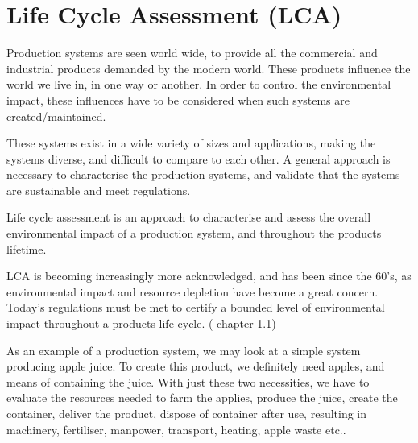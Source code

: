 \section{Life Cycle Assessment (LCA)}\label{sec:Background}

Production systems are seen world wide, to provide all the commercial and industrial products demanded by the modern world. These products influence the world we live in, in one way or another. In order to control the environmental impact, these influences have to be considered when such systems are created/maintained. 

These systems exist in a wide variety of sizes and applications, making the systems diverse, and difficult to compare to each other. A general approach is necessary to characterise the production systems, and validate that the systems are sustainable and meet regulations.

Life cycle assessment is an approach to characterise and assess the overall environmental impact of a production system, and throughout the products lifetime.

LCA is becoming increasingly more acknowledged, and has been since the 60’s, as environmental impact and resource depletion have become a great concern. Today's regulations must be met to certify a bounded level of environmental impact throughout a products life cycle. (\cite{LCA_TheoryAndPractice} chapter 1.1)

As an example of a production system, we may look at a simple system producing apple juice. To create this product, we definitely need apples, and means of containing the juice. With just these two necessities, we have to evaluate the resources needed to farm the applies, produce the juice, create the container, deliver the product, dispose of container after use, resulting in machinery, fertiliser, manpower, transport, heating, apple waste etc.. 

